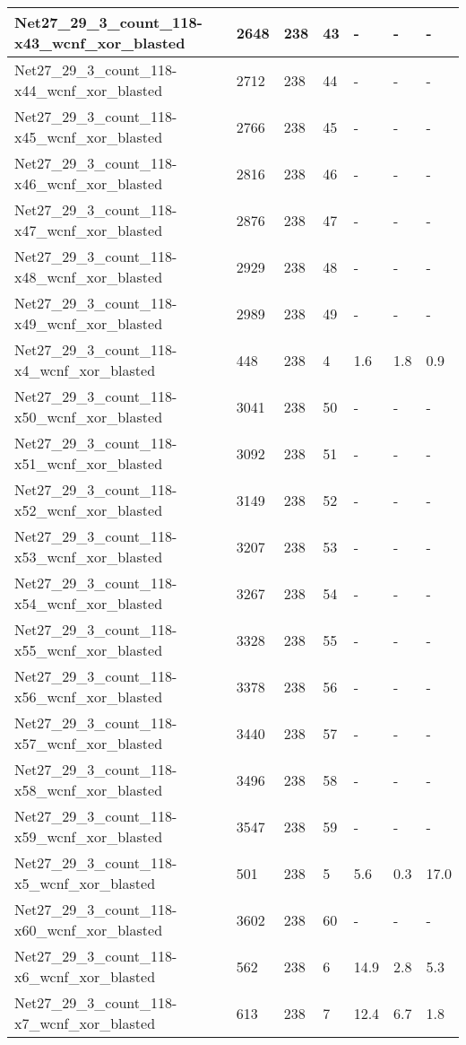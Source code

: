 \begin{scriptsize}
\begin{longtable}{|p{5cm}|l|l|l|l|l|l|}
Net27\_29\_3\_count\_118-x43\_wcnf\_xor\_blasted&2648&238&43&-&-&- \\ \hline 
Net27\_29\_3\_count\_118-x44\_wcnf\_xor\_blasted&2712&238&44&-&-&- \\ \hline 
Net27\_29\_3\_count\_118-x45\_wcnf\_xor\_blasted&2766&238&45&-&-&- \\ \hline 
Net27\_29\_3\_count\_118-x46\_wcnf\_xor\_blasted&2816&238&46&-&-&- \\ \hline 
Net27\_29\_3\_count\_118-x47\_wcnf\_xor\_blasted&2876&238&47&-&-&- \\ \hline 
Net27\_29\_3\_count\_118-x48\_wcnf\_xor\_blasted&2929&238&48&-&-&- \\ \hline 
Net27\_29\_3\_count\_118-x49\_wcnf\_xor\_blasted&2989&238&49&-&-&- \\ \hline 
Net27\_29\_3\_count\_118-x4\_wcnf\_xor\_blasted&448&238&4&1.6&1.8&0.9 \\ \hline 
Net27\_29\_3\_count\_118-x50\_wcnf\_xor\_blasted&3041&238&50&-&-&- \\ \hline 
Net27\_29\_3\_count\_118-x51\_wcnf\_xor\_blasted&3092&238&51&-&-&- \\ \hline 
Net27\_29\_3\_count\_118-x52\_wcnf\_xor\_blasted&3149&238&52&-&-&- \\ \hline 
Net27\_29\_3\_count\_118-x53\_wcnf\_xor\_blasted&3207&238&53&-&-&- \\ \hline 
Net27\_29\_3\_count\_118-x54\_wcnf\_xor\_blasted&3267&238&54&-&-&- \\ \hline 
Net27\_29\_3\_count\_118-x55\_wcnf\_xor\_blasted&3328&238&55&-&-&- \\ \hline 
Net27\_29\_3\_count\_118-x56\_wcnf\_xor\_blasted&3378&238&56&-&-&- \\ \hline 
Net27\_29\_3\_count\_118-x57\_wcnf\_xor\_blasted&3440&238&57&-&-&- \\ \hline 
Net27\_29\_3\_count\_118-x58\_wcnf\_xor\_blasted&3496&238&58&-&-&- \\ \hline 
Net27\_29\_3\_count\_118-x59\_wcnf\_xor\_blasted&3547&238&59&-&-&- \\ \hline 
Net27\_29\_3\_count\_118-x5\_wcnf\_xor\_blasted&501&238&5&5.6&0.3&17.0 \\ \hline 
Net27\_29\_3\_count\_118-x60\_wcnf\_xor\_blasted&3602&238&60&-&-&- \\ \hline 
Net27\_29\_3\_count\_118-x6\_wcnf\_xor\_blasted&562&238&6&14.9&2.8&5.3 \\ \hline 
Net27\_29\_3\_count\_118-x7\_wcnf\_xor\_blasted&613&238&7&12.4&6.7&1.8 \\ \hline 

\end{longtable}
\end{scriptsize}
